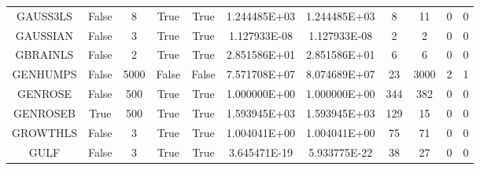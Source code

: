 \begin{longtable}{ccccccccccc}
	\cellcolor{default1} GAUSS3LS& \cellcolor{default1} False& \cellcolor{default1} 8& \cellcolor{default1} True& \cellcolor{default1} True& \cellcolor{best} 1.244485E+03& \cellcolor{ok} 1.244485E+03& \cellcolor{best} 8& \cellcolor{ok} 11& \cellcolor{default1} 0& \cellcolor{default1} 0\\
	\cellcolor{default2} GAUSSIAN& \cellcolor{default2} False& \cellcolor{default2} 3& \cellcolor{default2} True& \cellcolor{default2} True& \cellcolor{best} 1.127933E-08& \cellcolor{ok} 1.127933E-08& \cellcolor{best} 2& \cellcolor{best} 2& \cellcolor{default2} 0& \cellcolor{default2} 0\\
	\cellcolor{default1} GBRAINLS& \cellcolor{default1} False& \cellcolor{default1} 2& \cellcolor{default1} True& \cellcolor{default1} True& \cellcolor{best} 2.851586E+01& \cellcolor{ok} 2.851586E+01& \cellcolor{best} 6& \cellcolor{best} 6& \cellcolor{default1} 0& \cellcolor{default1} 0\\
	\cellcolor{default2} GENHUMPS& \cellcolor{default2} False& \cellcolor{default2} 5000& \cellcolor{default2} False& \cellcolor{default2} False& \cellcolor{best} 7.571708E+07& \cellcolor{poor} 8.074689E+07& \cellcolor{best} 23& \cellcolor{poor} 3000& \cellcolor{default2} 2& \cellcolor{default2} 1\\
	\cellcolor{default1} GENROSE& \cellcolor{default1} False& \cellcolor{default1} 500& \cellcolor{default1} True& \cellcolor{default1} True& \cellcolor{best} 1.000000E+00& \cellcolor{best} 1.000000E+00& \cellcolor{best} 344& \cellcolor{ok} 382& \cellcolor{default1} 0& \cellcolor{default1} 0\\
	\cellcolor{default2} GENROSEB& \cellcolor{default2} True& \cellcolor{default2} 500& \cellcolor{default2} True& \cellcolor{default2} True& \cellcolor{best} 1.593945E+03& \cellcolor{ok} 1.593945E+03& \cellcolor{poor} 129& \cellcolor{best} 15& \cellcolor{default2} 0& \cellcolor{default2} 0\\
	\cellcolor{default1} GROWTHLS& \cellcolor{default1} False& \cellcolor{default1} 3& \cellcolor{default1} True& \cellcolor{default1} True& \cellcolor{best} 1.004041E+00& \cellcolor{ok} 1.004041E+00& \cellcolor{ok} 75& \cellcolor{best} 71& \cellcolor{default1} 0& \cellcolor{default1} 0\\
	\cellcolor{default2} GULF& \cellcolor{default2} False& \cellcolor{default2} 3& \cellcolor{default2} True& \cellcolor{default2} True& \cellcolor{ok} 3.645471E-19& \cellcolor{best} 5.933775E-22& \cellcolor{ok} 38& \cellcolor{best} 27& \cellcolor{default2} 0& \cellcolor{default2} 0\\

\end{longtable}
